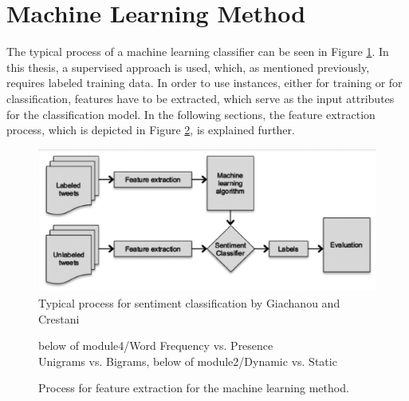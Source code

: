 \section{Machine Learning Method}
The typical process of a machine learning classifier can be seen in Figure \ref{fig:ml_approach}. In this thesis, a supervised approach is used, which, as mentioned previously, requires labeled training data. In order to use instances, either for training or for classification, features have to be extracted, which serve as the input attributes for the classification model. In the following sections, the feature extraction process, which is depicted in Figure \ref{fig:ml_process}, is explained further.
\begin{figure}
    \centering
    \includegraphics[scale=0.5]{Images/ML_approach.png}
    \caption{Typical process for sentiment classification by Giachanou and Crestani \cite[p.~28:3]{DBLP:journals/csur/GiachanouC16}}
    \label{fig:ml_approach}
\end{figure}


\begin{figure}
    \centering

    {below of module4/Word Frequency vs. Presence \\ Unigrams vs. Bigrams, below of module2/Dynamic vs. Static} 

    \vspace{25mm}

   \caption{Process for feature extraction for the machine learning method.}
    \label{fig:ml_process}
\end{figure}



